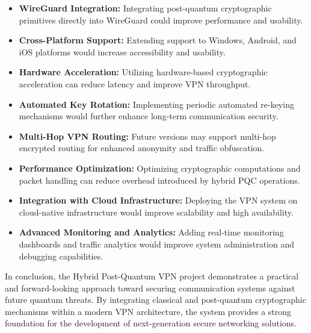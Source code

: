 \begin{itemize}

    \item \textbf{WireGuard Integration:}
    Integrating post-quantum cryptographic primitives directly into WireGuard could improve performance and usability.

    \item \textbf{Cross-Platform Support:}
    Extending support to Windows, Android, and iOS platforms would increase accessibility and usability.

    \item \textbf{Hardware Acceleration:}
    Utilizing hardware-based cryptographic acceleration can reduce latency and improve VPN throughput.

    \item \textbf{Automated Key Rotation:}
    Implementing periodic automated re-keying mechanisms would further enhance long-term communication security.

    \item \textbf{Multi-Hop VPN Routing:}
    Future versions may support multi-hop encrypted routing for enhanced anonymity and traffic obfuscation.

    \item \textbf{Performance Optimization:}
    Optimizing cryptographic computations and packet handling can reduce overhead introduced by hybrid PQC operations.

    \item \textbf{Integration with Cloud Infrastructure:}
    Deploying the VPN system on cloud-native infrastructure would improve scalability and high availability.

    \item \textbf{Advanced Monitoring and Analytics:}
    Adding real-time monitoring dashboards and traffic analytics would improve system administration and debugging capabilities.

\end{itemize}

In conclusion, the Hybrid Post-Quantum VPN project demonstrates a practical and forward-looking approach toward securing communication systems against future quantum threats. By integrating classical and post-quantum cryptographic mechanisms within a modern VPN architecture, the system provides a strong foundation for the development of next-generation secure networking solutions.